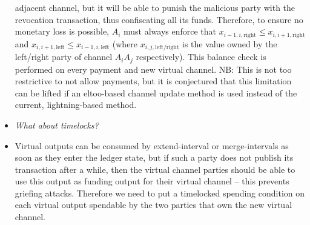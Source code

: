 \begin{itemize}
  adjacent channel, but it will be able to punish the malicious party with the
  revocation transaction, thus confiscating all its funds. Therefore, to ensure
  no monetary loss is possible, $A_i$ must always enforce that $x_{i-1, i,
  \mathrm{right}} \leq x_{i, i+1, \mathrm{right}}$ and $x_{i, i+1,
  \mathrm{left}} \leq x_{i-1, i, \mathrm{left}}$ (where $x_{i, j,
  \mathrm{left/right}}$ is the value owned by the left/right party of channel
  $A_i A_j$ respectively). This balance check is performed on every payment and
  new virtual channel. NB: This is not too restrictive to not allow payments,
  but it is conjectured that this limitation can be lifted if an eltoo-based
  channel update method is used instead of the current, lightning-based method.
  \item \emph{What about timelocks?}
  \item Virtual outputs can be consumed by extend-interval or merge-intervals as
  soon as they enter the ledger state, but if such a party does not publish its
  transaction after a while, then the virtual channel parties should be able to
  use this output as funding output for their virtual channel -- this prevents
  griefing attacks. Therefore we need to put a timelocked spending condition on
  each virtual output spendable by the two parties that own the new virtual
  channel.


\end{itemize}
